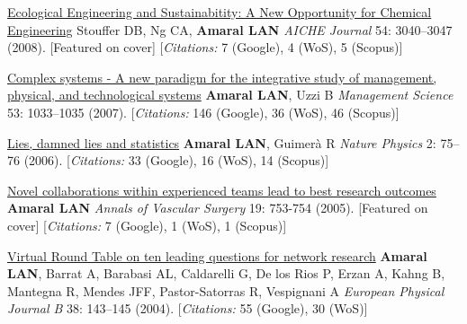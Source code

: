 \NumberedItem{\makebox[0.8cm][r]{[6]}}
\href{/people/amaral/ecological-engineering-and-sustainabitity-a-new-opportunity-for-chemical-engineering}
{Ecological Engineering and Sustainabitity: A New Opportunity for Chemical Engineering}
\newline
Stouffer DB, Ng CA, {\textbf{Amaral LAN}}
\newline
\textit{AICHE Journal}
    54:
3040--3047 (2008).
    [Featured on cover]
    [{\em{Citations:}} 7 (Google), 4 (WoS), 5 (Scopus)]
\newline
\Gap
~
\Gap

\NumberedItem{\makebox[0.8cm][r]{[5]}}
\href{/people/amaral/complex-systems-a-new-paradigm-for-the-integrative-study-of-management-physical-and-technological-systems}
{Complex systems - A new paradigm for the integrative study of management, physical, and technological systems}
\newline
{\textbf{Amaral LAN}}, Uzzi B
\newline
\textit{Management Science}
    53:
1033--1035 (2007).
    [{\em{Citations:}} 146 (Google), 36 (WoS), 46 (Scopus)]
\newline
\Gap
~
\Gap

\NumberedItem{\makebox[0.8cm][r]{[4]}}
\href{/people/amaral/lies-damned-lies-and-statistics}
{Lies, damned lies and statistics}
\newline
{\textbf{Amaral LAN}}, Guimer\`a R
\newline
\textit{Nature Physics}
    2:
75--76 (2006).
    [{\em{Citations:}} 33 (Google), 16 (WoS), 14 (Scopus)]
\newline
\Gap
~
\Gap

\NumberedItem{\makebox[0.8cm][r]{[3]}}
\href{/people/amaral/novel-collaborations-within-experienced-teams-lead-to-best-research-outcomes}
{Novel collaborations within experienced teams lead to best research outcomes}
\newline
{\textbf{Amaral LAN}}
\newline
\textit{Annals of Vascular Surgery}
    19:
753-754 (2005).
    [Featured on cover]
    [{\em{Citations:}} 7 (Google), 1 (WoS), 1 (Scopus)]
\newline
\Gap
~
\Gap

\NumberedItem{\makebox[0.8cm][r]{[2]}}
\href{False}
{Virtual Round Table on ten leading questions for network research}
\newline
{\textbf{Amaral LAN}}, Barrat A, Barabasi AL, Caldarelli G, De los Rios P, Erzan A, Kahng B, Mantegna R, Mendes JFF, Pastor-Satorras R, Vespignani A 
\newline
\textit{European Physical Journal B}
    38:
143--145  (2004).
    [{\em{Citations:}} 55 (Google), 30 (WoS)]
\newline
\Gap
~
\Gap

